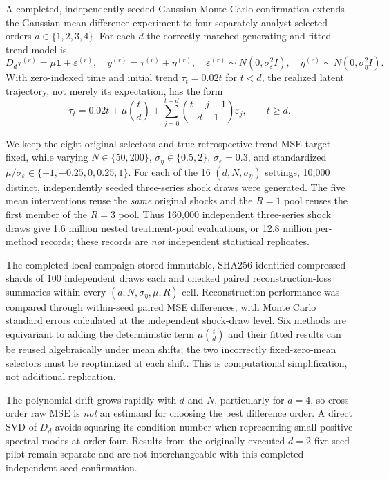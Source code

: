 \documentclass[11pt]{article}
\begin{document}
A completed, independently seeded Gaussian
Monte Carlo confirmation extends the Gaussian mean-difference
experiment to four separately analyst-selected orders
$d\in\{1,2,3,4\}$. For each $d$ the correctly matched
generating and fitted trend model is
\begin{equation}\label{eq:multorder-dgp}
 D_d\tau^{(r)}=\mu\mathbf1+\varepsilon^{(r)},\quad
 y^{(r)}=\tau^{(r)}+\eta^{(r)},\quad
 \varepsilon^{(r)}\sim N(0,\sigma_\varepsilon^2I),\quad
 \eta^{(r)}\sim N(0,\sigma_\eta^2I).
\end{equation}
With zero-indexed time and initial trend
$\tau_t=0.02t$ for $t<d$, the realized latent
trajectory, not merely its expectation, has the form
\begin{equation}\label{eq:multorder-latent-trajectory}
 \tau_t=0.02t+\mu\binom{t}{d}
  +\sum_{j=0}^{t-d}\binom{t-j-1}{d-1}\varepsilon_j,
 \qquad t\ge d .
\end{equation}

We keep the eight original selectors and true
retrospective trend-MSE target fixed, while varying
$N\in\{50,200\}$, $\sigma_\eta\in\{0.5,2\}$,
$\sigma_\varepsilon=0.3$, and standardized
$\mu/\sigma_\varepsilon\in\{-1,-0.25,0,0.25,1\}$.
For each of the 16 $(d,N,\sigma_\eta)$ settings,
10,000 distinct, independently seeded three-series
shock draws were generated. The five mean interventions
reuse the \emph{same} original shocks and the
$R=1$ pool reuses the first member of the $R=3$
pool. Thus 160,000 independent three-series shock
draws give 1.6 million nested treatment-pool
evaluations, or 12.8 million per-method records;
these records are \emph{not} independent statistical
replicates.

The completed local campaign stored immutable,
SHA256-identified compressed shards of 100 independent
draws each and checked paired reconstruction-loss
summaries within every $(d,N,\sigma_\eta,\mu,R)$ cell.
Reconstruction performance was compared through
within-seed paired MSE differences, with Monte Carlo
standard errors calculated at the independent
shock-draw level. Six methods are
equivariant to adding the deterministic term
$\mu\binom{t}{d}$ and their fitted results can
be reused algebraically under mean shifts;
the two incorrectly fixed-zero-mean selectors
must be reoptimized at each shift. This is
computational simplification, not additional
replication.

The polynomial drift grows rapidly with
$d$ and $N$, particularly for $d=4$, so
cross-order raw MSE is \emph{not} an estimand
for choosing the best difference order.
A direct SVD of $D_d$ avoids squaring its
condition number when representing small
positive spectral modes at order four.
Results from the originally executed $d=2$
five-seed pilot remain separate and are not
interchangeable with this completed
independent-seed confirmation.
\end{document}
